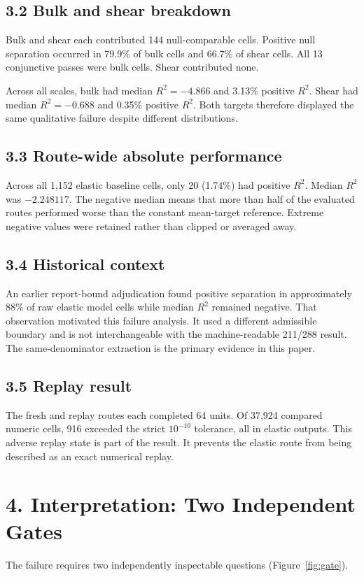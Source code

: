 \documentclass[10pt,a4paper]{article}
\begin{document}
\subsection{3.2 Bulk and shear breakdown}
Bulk and shear each contributed 144 null-comparable cells. Positive null separation occurred in 79.9\% of bulk cells and 66.7\% of shear cells. All 13 conjunctive passes were bulk cells. Shear contributed none.

Across all scales, bulk had median $R^2=-4.866$ and 3.13\% positive $R^2$. Shear had median $R^2=-0.688$ and 0.35\% positive $R^2$. Both targets therefore displayed the same qualitative failure despite different distributions.

\subsection{3.3 Route-wide absolute performance}
Across all 1,152 elastic baseline cells, only 20 (1.74\%) had positive $R^2$. Median $R^2$ was $-2.248117$. The negative median means that more than half of the evaluated routes performed worse than the constant mean-target reference. Extreme negative values were retained rather than clipped or averaged away.

\subsection{3.4 Historical context}
An earlier report-bound adjudication found positive separation in approximately 88\% of raw elastic model cells while median $R^2$ remained negative. That observation motivated this failure analysis. It used a different admissible boundary and is not interchangeable with the machine-readable 211/288 result. The same-denominator extraction is the primary evidence in this paper.

\subsection{3.5 Replay result}
The fresh and replay routes each completed 64 units. Of 37,924 compared numeric cells, 916 exceeded the strict $10^{-10}$ tolerance, all in elastic outputs. This adverse replay state is part of the result. It prevents the elastic route from being described as an exact numerical replay.

\section{4. Interpretation: Two Independent Gates}
The failure requires two independently inspectable questions (Figure~\ref{fig:gate}).
\end{document}
